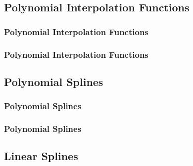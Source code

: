 \documentclass[fleqn]{beamer} %
\newcommand{\sectionIIIsubsectionItitle}{Polynomial Interpolation Functions}
\newcommand{\sectionIIIsubsectionIItitle}{Polynomial Splines}
\newcommand{\sectionIIIsubsectionIIItitle}{Linear Splines}
\begin{document}
		\subsection{\sectionIIIsubsectionItitle}\label{sectionIIIsubsectionI}

			\begin{frame}
				\frametitle{\sectionIIIsubsectionItitle}
				\bigskip

			  	
				\btVFill
			\end{frame}

			\begin{frame}
				\frametitle{\sectionIIIsubsectionItitle}
				\bigskip

			  
				\btVFill
			\end{frame}


		\subsection{\sectionIIIsubsectionIItitle}\label{sectionIIIsubsectionII}	

			\begin{frame}
				\frametitle{\sectionIIIsubsectionIItitle}
				\bigskip

				
				\btVFill
			\end{frame}

			\begin{frame}
				\frametitle{\sectionIIIsubsectionIItitle}
				\bigskip
				

				\btVFill
			\end{frame}


		\subsection{\sectionIIIsubsectionIIItitle}\label{sectionIIIsubsectionIII}
\end{document}

